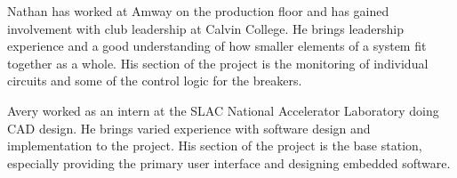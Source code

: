 Nathan has worked at Amway on the production floor and has gained involvement with club leadership at Calvin College. He brings leadership experience and a good understanding of how smaller elements of a system fit together as a whole. His section of the project is the monitoring of individual circuits and some of the control logic for the breakers.

Avery worked as an intern at the SLAC National Accelerator Laboratory doing \ac{CAD} design. He brings varied experience with software design and implementation to the project. His section of the project is the base station, especially providing the primary user interface and designing embedded software.

